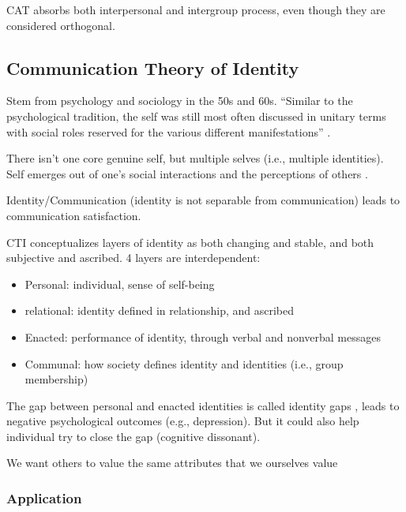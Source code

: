 \documentclass[
]{book}
\providecommand{\tightlist}{%
  \setlength{\itemsep}{0pt}\setlength{\parskip}{0pt}}
\begin{document}
CAT absorbs both interpersonal and intergroup process, even though they are considered orthogonal.

\hypertarget{communication-theory-of-identity}{%
\subsection{Communication Theory of Identity}\label{communication-theory-of-identity}}

Stem from psychology and sociology in the 50s and 60s. ``Similar to the psychological tradition, the self was still most
often discussed in unitary terms with social roles reserved for the various different manifestations'' \citep[pp.
254]{Baxter_2008}.

There isn't one core genuine self, but multiple selves (i.e., multiple identities). Self emerges out of one's social
interactions and the perceptions of others \citep{stryker1979}.

Identity/Communication (identity is not separable from communication) leads to communication satisfaction.

CTI conceptualizes layers of identity as both changing and stable, and both subjective and ascribed. 4 layers are
interdependent:

\begin{itemize}
\tightlist
\item
  Personal: individual, sense of self-being
\item
  relational: identity defined in relationship, and ascribed
\item
  Enacted: performance of identity, through verbal and nonverbal messages
\item
  Communal: how society defines identity and identities (i.e., group membership)
\end{itemize}

The gap between personal and enacted identities is called identity gaps \citep{Jung_2004}, leads to negative psychological
outcomes (e.g., depression). But it could also help individual try to close the gap (cognitive dissonant).

We want others to value the same attributes that we ourselves value \citep[pp.~261]{Baxter_2008}

\hypertarget{application}{%
\subsubsection{Application}\label{application}}
\end{document}
